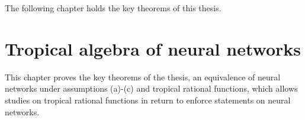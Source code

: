 \documentclass{article}
\theoremstyle{definition}
\newtheorem{comment}[theorem]{Comment}
\begin{document}

The following chapter holds the key theorems of this thesis.

\newpage

\section{Tropical algebra of neural networks}\label{sec:trop_netw}

This chapter proves the key theorems of the thesis, an equivalence of neural networks under assumptions (a)-(c) and tropical rational functions, which allows studies on tropical rational functions in return to enforce statements on neural networks.

\end{document}
